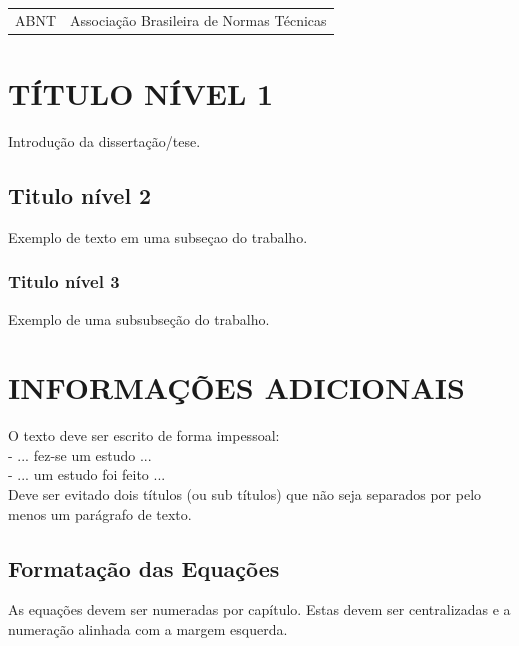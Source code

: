 \documentclass[a4paper,12pt,oneside]{article}
\numberwithin{equation}{section}
\begin{document}
\begin{changemargin}{1.5cm}{1.5cm} 
	\begin{tabular}{ll}
		ABNT 	&	Associação Brasileira de Normas Técnicas\\

	\end{tabular}
\end{changemargin}






\section{TÍTULO NÍVEL 1}

Introdução da dissertação/tese.

\subsection{Titulo nível 2}

Exemplo de texto em uma subseçao do trabalho.


\subsubsection{Titulo nível 3}

Exemplo de uma subsubseção do trabalho.


\section{INFORMAÇÕES ADICIONAIS}

O texto deve ser escrito de forma impessoal:\\

\noindent- ... fez-se um estudo ...\\
- ... um estudo foi feito ...\\


Deve ser evitado dois títulos (ou sub títulos) que não seja separados por pelo menos um
parágrafo de texto.


\subsection{Formatação das Equações}

As equações devem ser numeradas por capítulo. Estas devem ser centralizadas e a numeração alinhada com a margem esquerda.
\end{document}
